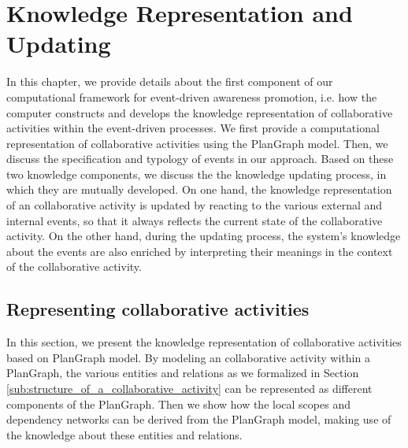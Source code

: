 \graphicspath{{Figures/}}

\chapter{Knowledge Representation and Updating} %
\label{cha:knowledge_reprsentation_and_updating}
In this chapter, we provide details about the first component of our computational framework for event-driven awareness promotion, i.e. how the computer constructs and develops the knowledge representation of collaborative activities within the event-driven processes. We first provide a computational representation of collaborative activities using the PlanGraph model. Then, we discuss the specification and typology of events in our approach. Based on these two knowledge components, we discuss the the knowledge updating process, in which they are mutually developed. On one hand, the knowledge representation of an collaborative activity is updated by reacting to the various external and internal events, so that it always reflects the current state of the collaborative activity. On the other hand, during the updating process, the system's knowledge about the events are also enriched by interpreting their meanings in the context of the collaborative activity.

\section{Representing collaborative activities} %
\label{sec:representing_the_field_of_work}
In this section, we present the knowledge representation of collaborative activities based on PlanGraph model. By modeling an collaborative activity within a PlanGraph, the various entities and relations as we formalized in Section \ref{sub:structure_of_a_collaborative_activity} can be represented as different components of the PlanGraph. Then we show how the local scopes and dependency networks can be derived from the PlanGraph model, making use of the knowledge about these entities and relations.

